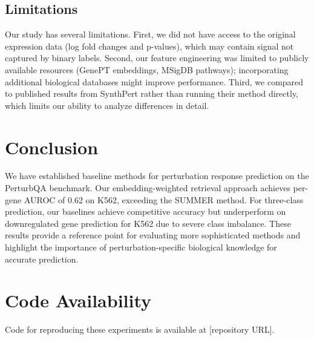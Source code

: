 \documentclass[11pt]{article}
\begin{document}
\subsection{Limitations}

Our study has several limitations. First, we did not have access to the original expression data (log fold changes and p-values), which may contain signal not captured by binary labels. Second, our feature engineering was limited to publicly available resources (GenePT embeddings, MSigDB pathways); incorporating additional biological databases might improve performance. Third, we compared to published results from SynthPert rather than running their method directly, which limits our ability to analyze differences in detail.

\section{Conclusion}

We have established baseline methods for perturbation response prediction on the PerturbQA benchmark. Our embedding-weighted retrieval approach achieves per-gene AUROC of 0.62 on K562, exceeding the SUMMER method. For three-class prediction, our baselines achieve competitive accuracy but underperform on downregulated gene prediction for K562 due to severe class imbalance. These results provide a reference point for evaluating more sophisticated methods and highlight the importance of perturbation-specific biological knowledge for accurate prediction.

\section*{Code Availability}

Code for reproducing these experiments is available at [repository URL].



\end{document}
